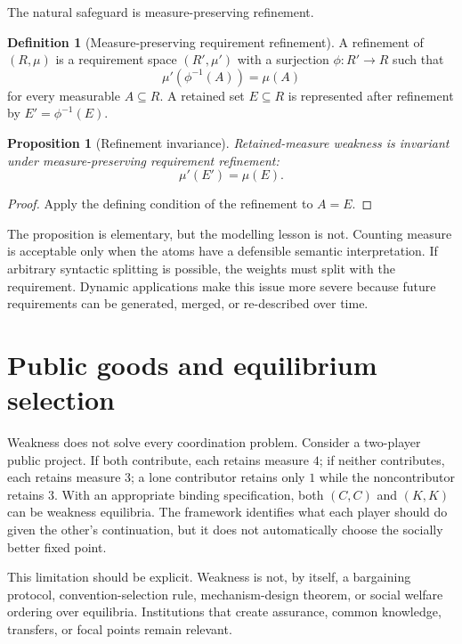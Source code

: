 \documentclass[11pt]{article}
\newtheorem{proposition}[theorem]{Proposition}
\theoremstyle{definition}
\newtheorem{definition}[theorem]{Definition}
\begin{document}
The natural safeguard is measure-preserving refinement.

\begin{definition}[Measure-preserving requirement refinement]
A refinement of $(R,\mu)$ is a requirement space $(R',\mu')$ with a surjection $\phi:R'\to R$ such that
\[
\mu'(\phi^{-1}(A))=\mu(A)
\]
for every measurable $A\subseteq R$. A retained set $E\subseteq R$ is represented after refinement by $E'=\phi^{-1}(E)$.
\end{definition}

\begin{proposition}[Refinement invariance]\label{prop:refinement}
Retained-measure weakness is invariant under measure-preserving requirement refinement:
\[
\mu'(E')=\mu(E).
\]
\end{proposition}

\begin{proof}
Apply the defining condition of the refinement to $A=E$.
\end{proof}

The proposition is elementary, but the modelling lesson is not. Counting measure is acceptable only when the atoms have a defensible semantic interpretation. If arbitrary syntactic splitting is possible, the weights must split with the requirement. Dynamic applications make this issue more severe because future requirements can be generated, merged, or re-described over time.

\section{Public goods and equilibrium selection}

Weakness does not solve every coordination problem. Consider a two-player public project. If both contribute, each retains measure $4$; if neither contributes, each retains measure $3$; a lone contributor retains only $1$ while the noncontributor retains $3$. With an appropriate binding specification, both $(C,C)$ and $(K,K)$ can be weakness equilibria. The framework identifies what each player should do given the other's continuation, but it does not automatically choose the socially better fixed point.

This limitation should be explicit. Weakness is not, by itself, a bargaining protocol, convention-selection rule, mechanism-design theorem, or social welfare ordering over equilibria. Institutions that create assurance, common knowledge, transfers, or focal points remain relevant.
\end{document}
